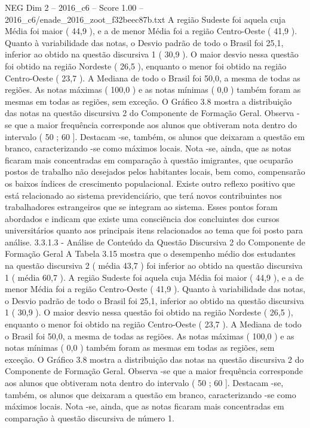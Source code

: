 \begin{textsample}{NEG Dim 2 – 2016\_c6 – Score 1.00 – 2016\_c6/enade\_2016\_zoot\_f32beec87b.txt}
A região Sudeste foi aquela cuja Média foi maior ( 44,9 ), e a de menor Média foi a região Centro-Oeste ( 41,9 ).
Quanto à variabilidade das notas, o Desvio padrão de todo o Brasil foi 25,1, inferior ao obtido na questão discursiva 1 ( 30,9 ).
O maior desvio nessa questão foi obtido na região Nordeste ( 26,5 ), enquanto o menor foi obtido na região Centro-Oeste ( 23,7 ).
A Mediana de todo o Brasil foi 50,0, a mesma de todas as regiões.
As notas máximas ( 100,0 ) e as notas mínimas ( 0,0 ) também foram as mesmas em todas as regiões, sem exceção.
O Gráfico 3.8 mostra a distribuição das notas na questão discursiva 2 do Componente de Formação Geral.
Observa -se que a maior frequência corresponde aos alunos que obtiveram nota dentro do intervalo ( 50 ; 60 ].
Destacam -se, também, os alunos que deixaram a questão em branco, caracterizando -se como máximos locais.
Nota -se, ainda, que as notas ficaram mais concentradas em comparação à questão imigrantes, que ocuparão postos de trabalho não desejados pelos habitantes locais, bem como, compensarão os baixos índices de crescimento populacional.
Existe outro reflexo positivo que está relacionado ao sistema previdenciário, que terá novos contribuintes nos trabalhadores estrangeiros que se integram ao sistema.
Esses pontos foram abordados e indicam que existe uma consciência dos concluintes dos cursos universitários quanto aos principais itens relacionados ao tema que foi posto para análise. 3.3.1.3 - Análise de Conteúdo da Questão Discursiva 2 do Componente de Formação Geral A Tabela 3.15 mostra que o desempenho médio dos estudantes na questão discursiva 2 ( média 43,7 ) foi inferior ao obtido na questão discursiva 1 ( média 60,7 ).
A região Sudeste foi aquela cuja Média foi maior ( 44,9 ), e a de menor Média foi a região Centro-Oeste ( 41,9 ).
Quanto à variabilidade das notas, o Desvio padrão de todo o Brasil foi 25,1, inferior ao obtido na questão discursiva 1 ( 30,9 ).
O maior desvio nessa questão foi obtido na região Nordeste ( 26,5 ), enquanto o menor foi obtido na região Centro-Oeste ( 23,7 ).
A Mediana de todo o Brasil foi 50,0, a mesma de todas as regiões.
As notas máximas ( 100,0 ) e as notas mínimas ( 0,0 ) também foram as mesmas em todas as regiões, sem exceção.
O Gráfico 3.8 mostra a distribuição das notas na questão discursiva 2 do Componente de Formação Geral.
Observa -se que a maior frequência corresponde aos alunos que obtiveram nota dentro do intervalo ( 50 ; 60 ].
Destacam -se, também, os alunos que deixaram a questão em branco, caracterizando -se como máximos locais.
Nota -se, ainda, que as notas ficaram mais concentradas em comparação à questão discursiva de número 1.

\end{textsample}
